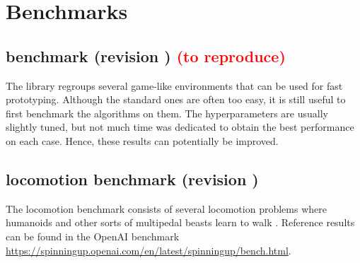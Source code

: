 \chapter{Benchmarks}

\section{\gym benchmark (revision ) \textcolor{red}{(to reproduce)}}

The \gym library regroups several game-like environments that can be used for fast prototyping. Although the standard ones are often too easy, it is still useful to first benchmark the algorithms on them. The hyperparameters are usually slightly tuned, but not much time was dedicated to obtain the best performance on each case. Hence, these results can potentially be improved.



\section{\mujoco locomotion benchmark (revision )}

The \mujoco locomotion benchmark consists of several locomotion problems where humanoids and other sorts of multipedal beasts learn to walk \cite{mujoco}. Reference results can be found in the OpenAI benchmark \url{https://spinningup.openai.com/en/latest/spinningup/bench.html}.

